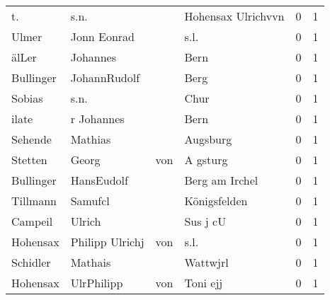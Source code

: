 \begin{center}
\begin{tiny}
\begin{longtabu}{llllrr}
                       t. &                               s.n. &             &                          Hohensax Ulrichvvn &          0 &         1 \\
                    Ulmer &                        Jonn Eonrad &             &                                        s.l. &          0 &         1 \\
                    älLer &                           Johannes &             &                                        Bern &          0 &         1 \\
                Bullinger &                       JohannRudolf &             &                                        Berg &          0 &         1 \\
                   Sobias &                               s.n. &             &                                        Chur &          0 &         1 \\
                    ilate &                         r Johannes &             &                                        Bern &          0 &         1 \\
                  Sehende &                            Mathias &             &                                    Augsburg &          0 &         1 \\
                  Stetten &                              Georg &         von &                                    A gsturg &          0 &         1 \\
                Bullinger &                         HansEudolf &             &                              Berg am Irchel &          0 &         1 \\
                 Tillmann &                            Samufcl &             &                                Königsfelden &          0 &         1 \\
                  Campeil &                             Ulrich &             &                                    Sus j cU &          0 &         1 \\
                 Hohensax &                    Philipp Ulrichj &         von &                                        s.l. &          0 &         1 \\
                 Schidler &                            Mathais &             &                                    Wattwjrl &          0 &         1 \\
                 Hohensax &                         UlrPhilipp &         von &                                    Toni ejj &          0 &         1 \\

\end{longtabu}
\end{tiny}
\end{center}
